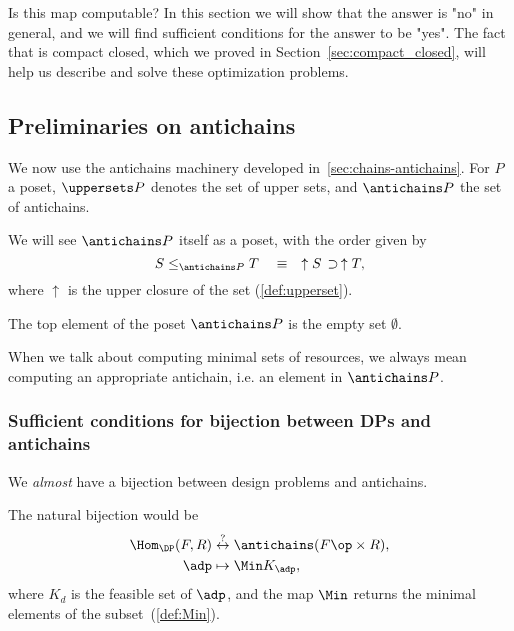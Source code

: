 Is this map computable? In this section we will show that the answer is "no" in general, and we will find sufficient conditions for the answer to be "yes". The fact that \DP is compact closed, which we proved in Section~\ref{sec:compact_closed}, will help us describe and solve these optimization problems.

\subsection{Preliminaries on antichains}

We now use the antichains machinery developed in~\cref{sec:chains-antichains}. For $P$ a poset, $\uppersets P$ denotes the set of upper sets, and $\antichains P$ the set of antichains.


We will see $\antichains P$ itself as a poset, with the order given
 by
\begin{equation}
  S \leq_{\antichains P} T  \quad \equiv \quad \uparrow S\, \supset\, \uparrow T,
\end{equation}
 where $\uparrow$ is the upper closure of the set (\cref{def:upperset}).

The top element of the poset $\antichains P$ is the empty set $\emptyset$.

When we talk about computing minimal sets of resources, we always mean computing an appropriate antichain, i.e. an element in $\antichains P$.

\subsubsection{Sufficient conditions for bijection between DPs and antichains}

We \emph{almost} have a bijection between design problems and antichains.

The natural bijection would be
\begin{equation}
\begin{aligned}
\Hom_\DP(F,R) &\overset{?}{\leftrightarrow} \antichains (F\op \times R), \\
\adp &\mapsto \Min K_\adp,
\end{aligned}
\end{equation}
where $K_d$ is the feasible set of $\adp$,
and the map $\Min$ returns the minimal elements of the subset~(\cref{def:Min}).

